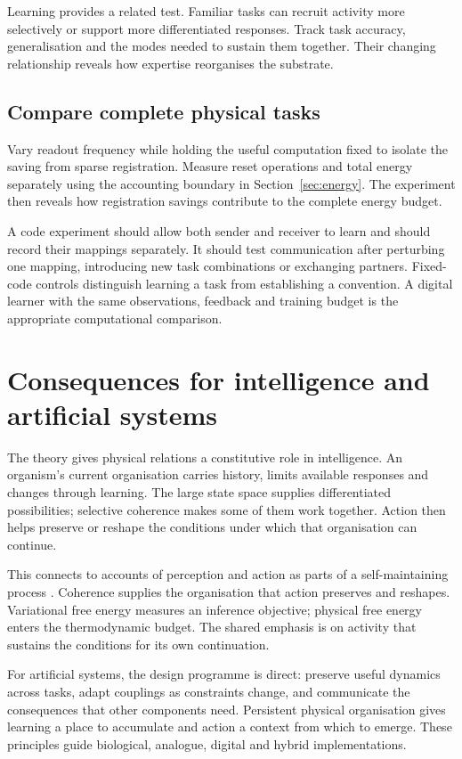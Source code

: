 \documentclass[11pt,a4paper]{article}
\begin{document}
Learning provides a related test. Familiar tasks can recruit activity more selectively or support more differentiated responses. Track task accuracy, generalisation and the modes needed to sustain them together. Their changing relationship reveals how expertise reorganises the substrate.

\subsection{Compare complete physical tasks}

Vary readout frequency while holding the useful computation fixed to isolate the saving from sparse registration. Measure reset operations and total energy separately using the accounting boundary in Section~\ref{sec:energy}. The experiment then reveals how registration savings contribute to the complete energy budget.

A code experiment should allow both sender and receiver to learn and should record their mappings separately. It should test communication after perturbing one mapping, introducing new task combinations or exchanging partners. Fixed-code controls distinguish learning a task from establishing a convention. A digital learner with the same observations, feedback and training budget is the appropriate computational comparison.

\section{Consequences for intelligence and artificial systems}

The theory gives physical relations a constitutive role in intelligence. An organism's current organisation carries history, limits available responses and changes through learning. The large state space supplies differentiated possibilities; selective coherence makes some of them work together. Action then helps preserve or reshape the conditions under which that organisation can continue.

This connects to accounts of perception and action as parts of a self-maintaining process \citep{friston2010}. Coherence supplies the organisation that action preserves and reshapes. Variational free energy measures an inference objective; physical free energy enters the thermodynamic budget. The shared emphasis is on activity that sustains the conditions for its own continuation.

For artificial systems, the design programme is direct: preserve useful dynamics across tasks, adapt couplings as constraints change, and communicate the consequences that other components need. Persistent physical organisation gives learning a place to accumulate and action a context from which to emerge. These principles guide biological, analogue, digital and hybrid implementations.
\end{document}
